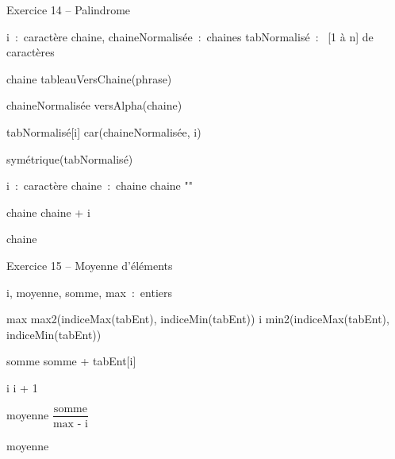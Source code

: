 \begin{Emphase}{Exercice 14 -- Palindrome}

\begin{pseudoN}


    \Decl i~:~caractère
    \Decl chaine, chaineNormalisée~:~chaines
    \Decl tabNormalisé~:~ [1 à n] de caractères

    \Let chaine \Gets tableauVersChaine(phrase)

    \Let chaineNormalisée \Gets versAlpha(chaine)


        \Let tabNormalisé[i] \Gets car(chaineNormalisée, i)
    \EndFor

    \Return symétrique(tabNormalisé)

\EndModule

    \Empty


    \Decl i~:~caractère
    \Decl chaine~:~chaine
    \Let chaine \Gets ""


        \Let chaine \Gets chaine + i

    \EndFor

    \Return chaine

\EndModule


\end{pseudoN}

\end{Emphase}


\begin{Emphase}{Exercice 15 -- Moyenne d’éléments}

\begin{pseudoN}


    \Decl i, moyenne, somme, max~:~entiers

    \Let max \Gets max2(indiceMax(tabEnt), indiceMin(tabEnt))
    \Let i \Gets min2(indiceMax(tabEnt), indiceMin(tabEnt))


        \Let somme \Gets somme + tabEnt[i]

        \Let i \Gets i + 1

    \EndWhile

    \Let moyenne \Gets $\displaystyle \dfrac{\text{somme}}{\text{max - i}}$

    \Write moyenne


\EndModule

\end{pseudoN}

\end{Emphase}



